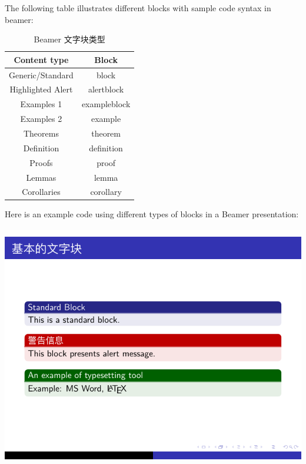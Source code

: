 The following table illustrates different blocks with sample code syntax in beamer:

\begin{table}[!h]
\begin{center}
\caption{Beamer 文字块类型}
\begin{tabular}{cc}
  \toprule
  Content type &  Block\\
  \midrule
  Generic/Standard	& {\ttfamily block}\\
  Highlighted Alert	& {\ttfamily alertblock}\\
  Examples 1	& {\ttfamily exampleblock}\\
  Examples 2	& {\ttfamily example}\\
  Theorems	& {\ttfamily theorem}\\
  Definition	& {\ttfamily definition}\\
  Proofs	& {\ttfamily proof}\\
  Lemmas	& {\ttfamily lemma}\\
  Corollaries	& {\ttfamily corollary}\\
  \bottomrule
\end{tabular}
\end{center}
\end{table}

Here is an example code using different types of blocks in a Beamer presentation:

\inputminted[linenos=true]{latex}{examples/beamer/block-styles1.tex}

\includegraphics[page=1]{examples/beamer/block-styles1.pdf}

